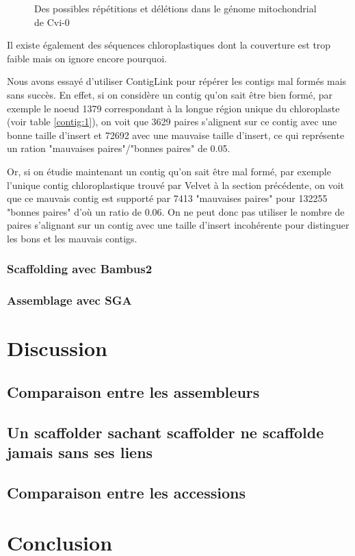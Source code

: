 \documentclass[a4paper]{article}
\begin{document}
\begin{enumerate}
\begin{figure}[!ht]
{\label{inc:2}
 }

\label{inc}
\caption{Des possibles répétitions et délétions dans le génome mitochondrial de Cvi-0}
\end{figure}

Il existe également des séquences chloroplastiques dont la couverture est trop faible mais on ignore encore pourquoi. 

\end{enumerate}

Nous avons essayé d'utiliser ContigLink pour répérer les contigs mal formés mais sans succès. En effet, si on considère un contig qu'on sait être bien formé, par exemple le noeud 1379 correspondant à la longue région unique du chloroplaste (voir table \ref{contig:1}), on voit que 3629 paires s'alignent sur ce contig avec une bonne taille d'insert et 72692 avec une mauvaise taille d'insert, ce qui représente un ration "mauvaises paires"/"bonnes paires" de 0.05. 

Or, si on étudie maintenant un contig qu'on sait être mal formé, par exemple l'unique contig chloroplastique trouvé par Velvet à la section précédente, on voit que ce mauvais contig est supporté par 7413 "mauvaises paires" pour 132255 "bonnes paires" d'où un ratio de 0.06. On ne peut donc pas utiliser le nombre de paires s'alignant sur un contig avec une taille d'insert incohérente pour distinguer les bons et les mauvais contigs. 

\subsubsection{Scaffolding avec Bambus2}

\subsubsection{Assemblage avec SGA}
 
\section{Discussion}

\subsection{Comparaison entre les assembleurs}






\subsection{Un scaffolder sachant scaffolder ne scaffolde jamais sans ses liens}

\subsection{Comparaison entre les accessions}

\section{Conclusion}








\end{document}
